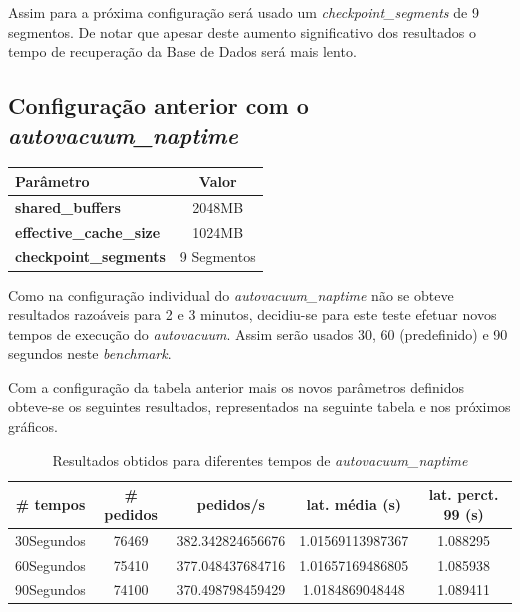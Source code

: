 Assim para a próxima configuração será usado um \textit{checkpoint\_segments} de 9 segmentos. De notar que apesar deste aumento significativo dos resultados o tempo de recuperação da Base de Dados será mais lento.


\newpage

\subsection{Configuração anterior com o \textit{autovacuum\_naptime}}

\begin{table}[!h]
\center
\small
\begin{tabular}{|l|c|}
\hline
\textbf{Parâmetro} & \textbf{Valor} \\ \hline
\textbf{shared\_buffers} & 2048MB  \\ \hline
\textbf{effective\_cache\_size} & 1024MB  \\ \hline
\textbf{checkpoint\_segments} & 9 Segmentos \\ \hline
\end{tabular}
\end{table}

Como na configuração individual do \textit{autovacuum\_naptime} não se obteve resultados razoáveis para 2 e 3 minutos, decidiu-se para este teste efetuar novos tempos de execução do \textit{autovacuum}. Assim serão usados 30, 60 (predefinido) e 90 segundos neste \textit{benchmark}.

Com a configuração da tabela anterior mais os novos parâmetros definidos obteve-se os seguintes resultados, representados na seguinte tabela e nos próximos gráficos.

\begin{table}[!h]
\center
\small
\begin{tabular}{|c|c|c|c|c|}
\hline
\textbf{\# tempos} & \textbf{\# pedidos} & \textbf{pedidos/s} & \textbf{lat. média (s)} & \textbf{lat. perct. 99 (s)}  \\ \hline
30Segundos & 76469 & 382.342824656676 & 1.01569113987367 & 1.088295  \\ \hline
60Segundos & 75410 & 377.048437684716 & 1.01657169486805 & 1.085938  \\ \hline
90Segundos & 74100 & 370.498798459429 & 1.0184869048448 & 1.089411  \\ \hline
\end{tabular}
\caption{Resultados obtidos para diferentes tempos de \textit{autovacuum\_naptime}}
\end{table}

